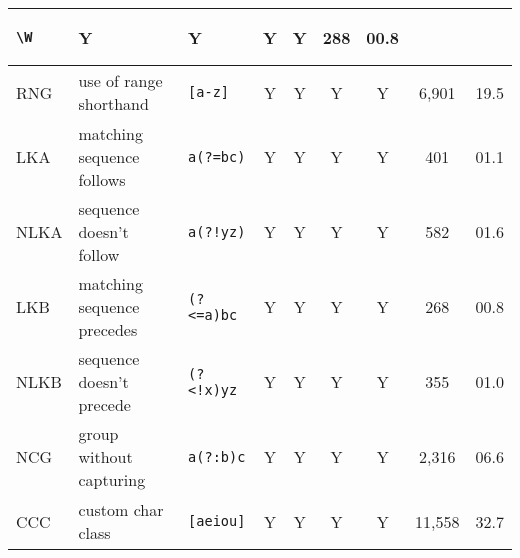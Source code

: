 \begin{xtabular}{lllcccccc}
\begin{minipage}{0.5in}\begin{verbatim}
\W
\end{verbatim}\end{minipage} & Y & Y & Y & Y & 288 & 00.8\\
\midrule
RNG & use of range shorthand &
\begin{minipage}{0.5in}\begin{verbatim}
[a-z]
\end{verbatim}\end{minipage} & Y & Y & Y & Y & 6,901 & 19.5\\
\midrule
LKA & matching sequence follows &
\begin{minipage}{0.5in}\begin{verbatim}
a(?=bc)
\end{verbatim}\end{minipage} & Y & Y & Y & Y & 401 & 01.1\\
\midrule
NLKA & sequence doesn't follow &
\begin{minipage}{0.5in}\begin{verbatim}
a(?!yz)
\end{verbatim}\end{minipage} & Y & Y & Y & Y & 582 & 01.6\\
\midrule
LKB & matching sequence precedes &
\begin{minipage}{0.5in}\begin{verbatim}
(?<=a)bc
\end{verbatim}\end{minipage} & Y & Y & Y & Y & 268 & 00.8\\
\midrule
NLKB & sequence doesn't precede &
\begin{minipage}{0.5in}\begin{verbatim}
(?<!x)yz
\end{verbatim}\end{minipage} & Y & Y & Y & Y & 355 & 01.0\\
\midrule
NCG & group without capturing &
\begin{minipage}{0.5in}\begin{verbatim}
a(?:b)c
\end{verbatim}\end{minipage} & Y & Y & Y & Y & 2,316 & 06.6\\
\midrule
CCC & custom char class &
\begin{minipage}{0.5in}\begin{verbatim}
[aeiou]
\end{verbatim}\end{minipage} & Y & Y & Y & Y & 11,558 & 32.7\\

\end{xtabular}
